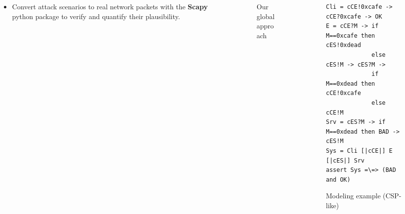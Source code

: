 \documentclass{beamer}
\begin{document}
\begin{frame}[fragile]{}
\begin{tcolorbox}[adjusted title={\centering\large Smart-Fuzzing of Industrial Systems}]
\begin{columns}[T]
\begin{column}{.35\textwidth}
\begin{tcolorbox}
\begin{itemize}
                        \item Convert attack scenarios to real network packets with the {\bf Scapy} python package to verify and quantify their plausibility.
                    \end{itemize}
                \end{tcolorbox}
            \end{column}
            \begin{column}{.65\textwidth}
                \begin{tcolorbox}[
                colback=white, %
                colframe=normalTitleBlockColor, %
                colframe=gray!20, %
                boxrule=1mm,
                coltext=black, %
                coltitle=black, %
                bottom=2mm,
                equal height group=C,
                valign = center,
                adjusted title={\large Approach}]
                    \begin{columns}[T]
                        \begin{column}{.5\textwidth}
                            \begin{figure}[htb]
                                \vspace{1.5em}
                                \resizebox{.95\columnwidth}{!}{
                                    
                                }
                                \vspace{-.25em}
                                \caption{Our global approach}
                            \end{figure}
                        \end{column}
                        \begin{column}{.5\textwidth}
                            \vspace{.5em}
                            \begin{figure}[htb]
\begin{lstlisting}
Cli = cCE!0xcafe -> cCE?0xcafe -> OK
E = cCE?M -> if M==0xcafe then cES!0xdead
             else cES!M -> cES?M ->
             if M==0xdead then cCE!0xcafe
             else cCE!M
Srv = cES?M -> if M==0xdead then BAD -> cES!M
Sys = Cli [|cCE|] E [|cES|] Srv
assert Sys =\=> (BAD and OK)
\end{lstlisting}
                                \caption{Modeling example (CSP-like)}

\end{figure}
\end{column}
\end{columns}
\end{tcolorbox}
\end{column}
\end{columns}
\end{tcolorbox}
\end{frame}
\end{document}
